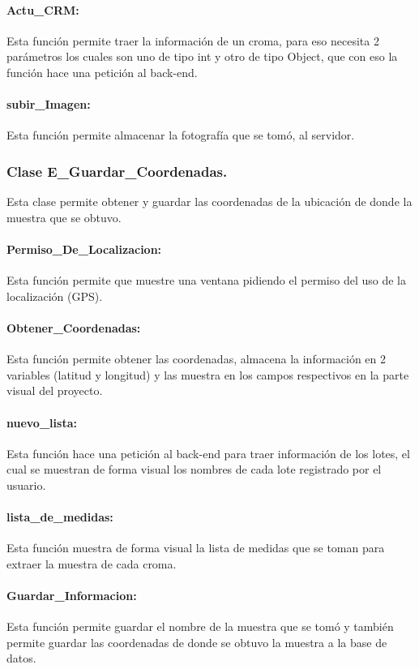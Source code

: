 \paragraph {Actu\_CRM:} Esta función permite traer la información de un croma, para eso necesita 2 parámetros los cuales son uno de tipo int 
y otro de tipo Object, que con eso la función hace una petición al back-end.
    
\paragraph {subir\_Imagen:} Esta función permite almacenar la fotografía que se tomó, al servidor.

\subsubsection{Clase E\_Guardar\_Coordenadas.}
Esta clase permite obtener y guardar las coordenadas de la ubicación de donde la muestra que se obtuvo.

\paragraph {Permiso\_De\_Localizacion:}
    Esta función permite que muestre una ventana pidiendo el permiso del uso de la localización (GPS).
    
\paragraph {Obtener\_Coordenadas:} Esta función permite obtener las coordenadas, almacena la información 
en 2 variables (latitud y longitud) y las muestra en los campos respectivos en la parte visual del proyecto.

\paragraph {nuevo\_lista:} Esta función hace una petición al back-end para traer información de los lotes, el 
cual se muestran de forma visual los nombres de cada lote registrado por el usuario.

\paragraph {lista\_de\_medidas:} Esta función muestra de forma visual la lista de medidas que se toman para extraer 
la muestra de cada croma.

\paragraph  {Guardar\_Informacion:} Esta función permite guardar el nombre de la muestra que se tomó y también permite 
guardar las coordenadas de donde se obtuvo la muestra a la base de datos.

